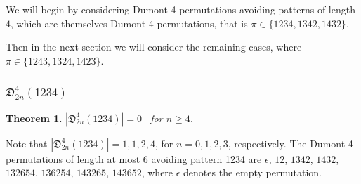 \documentclass[
final
]{dmtcs-episciences}
\newtheorem{theorem}{Theorem}[section]%
\theoremstyle{definition}
\theoremstyle{remark}
\begin{document}
We will begin by considering Dumont-4 permutations avoiding patterns of length $4$, which are themselves Dumont-4 permutations, that is $\pi\in\{1234, 1342, 1432\}$.

Then in the next section we will consider the remaining cases, where $\pi\in\{1243, 1324, 1423\}$.

\subsubsection{$\mathfrak{D}^4_{2n}(1234)$}

\begin{theorem}
$|\mathfrak{D}^4_{2n}(1234)| = 0$ \ for $n \ge 4$.
\end{theorem}

Note that $|\mathfrak{D}^4_{2n}(1234)| = 1, 1, 2, 4$, for $n=0, 1, 2, 3$, respectively. The Dumont-4 permutations of length at most 6 avoiding pattern 1234 are $\epsilon$, $12$, $1342$, $1432$, $132654$, $136254$, $143265$, $143652$, where $\epsilon$ denotes the empty permutation.
\end{document}
